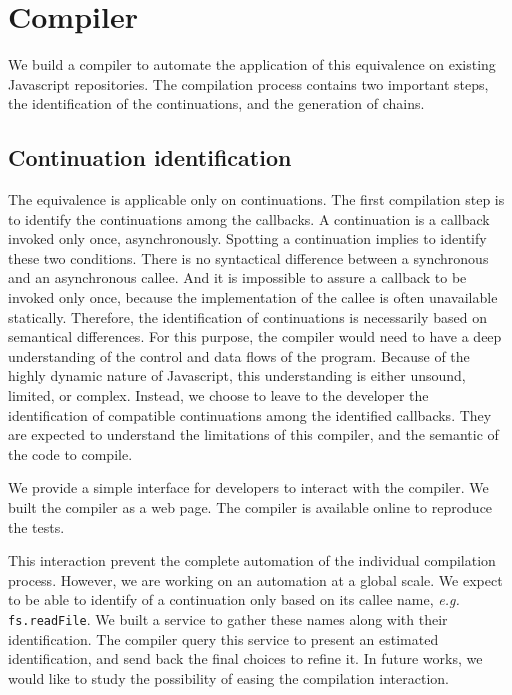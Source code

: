 \section{Compiler} \label{section:compiler}

We build a compiler to automate the application of this equivalence on existing Javascript repositories.
The compilation process contains two important steps, the identification of the continuations, and the generation of chains.

\subsection{Continuation identification}

The equivalence is applicable only on continuations.
The first compilation step is to identify the continuations among the callbacks.
A continuation is a callback invoked only once, asynchronously.
Spotting a continuation implies to identify these two conditions.
There is no syntactical difference between a synchronous and an asynchronous callee.
And it is impossible to assure a callback to be invoked only once, because the implementation of the callee is often unavailable statically.
Therefore, the identification of continuations is necessarily based on semantical differences.
For this purpose, the compiler would need to have a deep understanding of the control and data flows of the program.
Because of the highly dynamic nature of Javascript, this understanding is either unsound, limited, or complex.
Instead, we choose to leave to the developer the identification of compatible continuations among the identified callbacks.
They are expected to understand the limitations of this compiler, and the semantic of the code to compile.

We provide a simple interface for developers to interact with the compiler.
We built the compiler as a web page.
The compiler is available online to reproduce the tests.

This interaction prevent the complete automation of the individual compilation process.
However, we are working on an automation at a global scale.
We expect to be able to identify of a continuation only based on its callee name, \textit{e.g.} \texttt{fs.readFile}.
We built a service to gather these names along with their identification.
The compiler query this service to present an estimated identification, and send back the final choices to refine it.
In future works, we would like to study the possibility of easing the compilation interaction.

